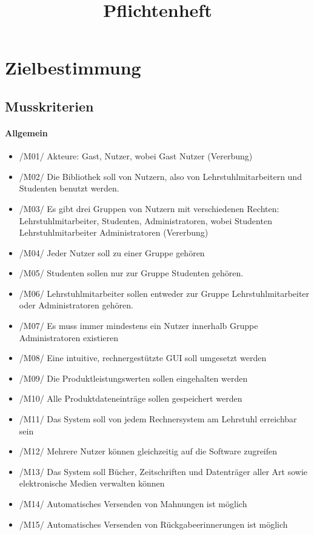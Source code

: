\documentclass[12pt, a4paper]{article}
\title{Pflichtenheft}
\begin{document}
\maketitle
\pagebreak
\tableofcontents
\pagebreak

\section{Zielbestimmung}
\subsection{Musskriterien}
\paragraph{Allgemein}
\begin{itemize}
	\item /M01/ Akteure: Gast, Nutzer, wobei Gast \< Nutzer (Vererbung)
	\item /M02/ Die Bibliothek soll von Nutzern, also von Lehrstuhlmitarbeitern und Studenten benutzt werden.
	\item /M03/ Es gibt drei Gruppen von Nutzern mit verschiedenen Rechten: Lehrstuhlmitarbeiter, Studenten, Administratoren, wobei Studenten \< Lehrstuhlmitarbeiter \< Administratoren (Vererbung)
	\item /M04/ Jeder Nutzer soll zu einer Gruppe gehören
	\item /M05/ Studenten sollen nur zur Gruppe Studenten gehören.
	\item /M06/ Lehrstuhlmitarbeiter sollen entweder zur Gruppe Lehrstuhlmitarbeiter oder Administratoren gehören.
	\item /M07/ Es muss immer mindestens ein Nutzer innerhalb Gruppe Administratoren existieren
	\item /M08/ Eine intuitive, rechnergestützte GUI soll umgesetzt werden
	\item /M09/ Die Produktleistungswerten sollen eingehalten werden
	\item /M10/ Alle Produktdateneinträge sollen gespeichert werden
	\item /M11/ Das System soll von jedem Rechnersystem am Lehrstuhl erreichbar sein
	\item /M12/ Mehrere Nutzer können gleichzeitig auf die Software zugreifen
	\item /M13/ Das System soll Bücher, Zeitschriften und Datenträger aller Art sowie elektronische Medien verwalten können
	\item /M14/ Automatisches Versenden von Mahnungen ist möglich
	\item /M15/ Automatisches Versenden von Rückgabeerinnerungen ist möglich
\end{itemize}
\end{document}
